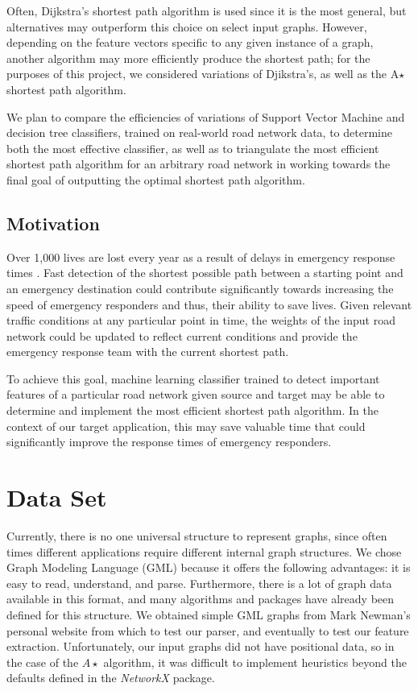 \documentclass{article}
\begin{document}
Often, Dijkstra's shortest path algorithm is used since it is the most general, but alternatives may outperform this choice on select input graphs. However, depending on the feature vectors specific to any given instance of a graph, another algorithm may more efficiently produce the shortest path; for the purposes of this project, we considered variations of Djikstra's, as well as the A$\star$ shortest path algorithm.

We plan to compare the efficiencies of variations of Support Vector Machine and decision tree classifiers, trained on real-world road network data, to determine both the most effective classifier, as well as to triangulate the most efficient shortest path algorithm for an arbitrary road network in working towards the final goal of outputting the optimal shortest path algorithm.

\subsection{Motivation}
Over 1,000 lives are lost every year as a result of delays in emergency response times . Fast detection of the shortest possible path between a starting point and an emergency destination could contribute significantly towards increasing the speed of emergency responders and thus, their ability to save lives. Given relevant traffic conditions at any particular point in time, the weights of the input road network could be updated to reflect current conditions and provide the emergency response team with the current shortest path.

To achieve this goal, machine learning classifier trained to detect important features of a particular road network given source and target may be able to determine and implement the most efficient shortest path algorithm. In the context of our target application, this may save valuable time that could significantly improve the response times of emergency responders. 

\section{Data Set}

Currently, there is no one universal structure to represent graphs, since often times different applications require different internal graph structures. We chose Graph Modeling Language (GML) because it offers the following advantages: it is easy to read, understand, and parse. Furthermore, there is a lot of graph data available in this format, and many algorithms and packages have already been defined for this structure. We obtained simple GML graphs from Mark Newman's personal website from which to test our parser, and eventually to test our feature extraction. Unfortunately, our input graphs did not have positional data, so in the case of the $A\star$ algorithm, it was difficult to implement heuristics beyond the defaults defined in the \textit{NetworkX} package.
\end{document}
